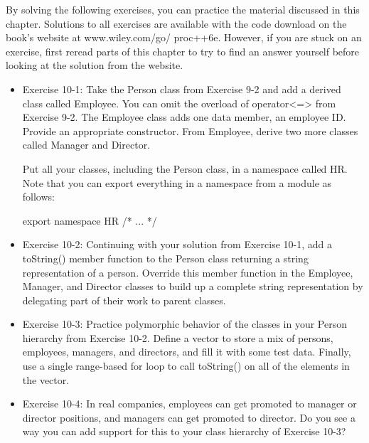 By solving the following exercises, you can practice the material discussed in this chapter. Solutions to all exercises are available with the code download on the book’s website at www.wiley.com/go/ proc++6e. However, if you are stuck on an exercise, first reread parts of this chapter to try to find an answer yourself before looking at the solution from the website.

\begin{itemize}
\item
Exercise 10-1: Take the Person class from Exercise 9-2 and add a derived class called Employee. You can omit the overload of operator<=> from Exercise 9-2. The Employee class adds one data member, an employee ID. Provide an appropriate constructor. From Employee, derive two more classes called Manager and Director.

Put all your classes, including the Person class, in a namespace called HR. Note that you can export everything in a namespace from a module as follows:

\begin{cpp}
export namespace HR { /* ... */ }
\end{cpp}

\item
Exercise 10-2: Continuing with your solution from Exercise 10-1, add a toString() member function to the Person class returning a string representation of a person. Override this member function in the Employee, Manager, and Director classes to build up a complete string representation by delegating part of their work to parent classes.

\item
Exercise 10-3: Practice polymorphic behavior of the classes in your Person hierarchy from Exercise 10-2. Define a vector to store a mix of persons, employees, managers, and directors, and fill it with some test data. Finally, use a single range-based for loop to call toString() on all of the elements in the vector.

\item
Exercise 10-4: In real companies, employees can get promoted to manager or director positions, and managers can get promoted to director. Do you see a way you can add support for this to your class hierarchy of Exercise 10-3?
\end{itemize}

